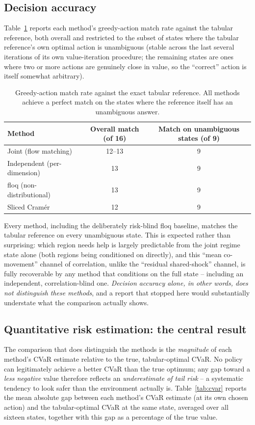 \documentclass[11pt]{article}
\begin{document}
\subsection{Decision accuracy}
Table~\ref{tab:match} reports each method's greedy-action match rate against the tabular reference, both overall and restricted to the subset of states where the tabular reference's own optimal action is unambiguous (stable across the last several iterations of its own value-iteration procedure; the remaining states are ones where two or more actions are genuinely close in value, so the ``correct'' action is itself somewhat arbitrary).

\begin{table}[h]
\centering
\begin{tabular}{lcc}
\toprule
Method & Overall match (of 16) & Match on unambiguous states (of 9) \\
\midrule
Joint (flow matching) & 12--13 & 9 \\
Independent (per-dimension) & 13 & 9 \\
floq (non-distributional) & 13 & 9 \\
Sliced Cram\'er & 12 & 9 \\
\bottomrule
\end{tabular}
\caption{Greedy-action match rate against the exact tabular reference. All methods achieve a perfect match on the states where the reference itself has an unambiguous answer.}
\label{tab:match}
\end{table}

Every method, including the deliberately risk-blind floq baseline, matches the tabular reference on every unambiguous state. This is expected rather than surprising: which region needs help is largely predictable from the joint regime state alone (both regions being conditioned on directly), and this ``mean co-movement'' channel of correlation, unlike the ``residual shared-shock'' channel, is fully recoverable by any method that conditions on the full state -- including an independent, correlation-blind one. \emph{Decision accuracy alone, in other words, does not distinguish these methods}, and a report that stopped here would substantially understate what the comparison actually shows.

\subsection{Quantitative risk estimation: the central result}
The comparison that does distinguish the methods is the \emph{magnitude} of each method's CVaR estimate relative to the true, tabular-optimal CVaR. No policy can legitimately achieve a better CVaR than the true optimum; any gap toward a \emph{less negative} value therefore reflects an \emph{underestimate of tail risk} -- a systematic tendency to look safer than the environment actually is. Table~\ref{tab:cvar} reports the mean absolute gap between each method's CVaR estimate (at its own chosen action) and the tabular-optimal CVaR at the same state, averaged over all sixteen states, together with this gap as a percentage of the true value.
\end{document}
